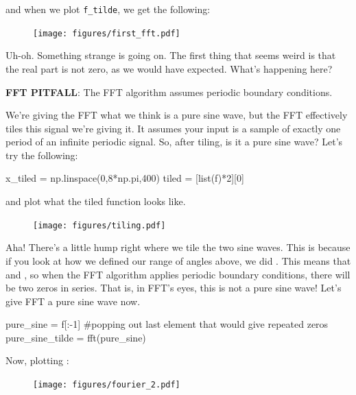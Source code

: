 \documentclass[a4paper]{article}
\newenvironment{colbox}[1]
  {\newcommand\colboxcolor{#1}%
   \begin{lrbox}{\selvestebox}%
   \begin{minipage}{\dimexpr\columnwidth-2\fboxsep\relax}}
  {\end{minipage}\end{lrbox}%
   \begin{center}
   \colorbox[HTML]{\colboxcolor}{\usebox{\selvestebox}}
   \end{center}}
\begin{document}
and when we plot \lstinline{f_tilde}, we get the following:

\begin{figure}[H]
    \centering
    \texttt{[image: figures/first\_fft.pdf]}
\end{figure}

Uh-oh. Something strange is going on. The first thing that seems weird is that the real part is not zero, as we would have expected. What's happening here?

\begin{colbox}{F8E0E0}
    \textbf{FFT PITFALL}: The FFT algorithm assumes periodic boundary conditions.
\end{colbox}

We're giving the FFT what we think is a pure sine wave, but the FFT effectively tiles this signal we're giving it. It assumes your input is a sample of exactly one period of an infinite periodic signal. So, after tiling, is it a pure sine wave? Let's try the following:
\begin{pyin}
x_tiled = np.linspace(0,8*np.pi,400)
tiled = [list(f)*2][0]
\end{pyin} 

\vspace{2pt}

and plot what the tiled function looks like. 

\begin{figure}[H]
    \centering
    \texttt{[image: figures/tiling.pdf]}
\end{figure}

Aha! There's a little hump right where we tile the two sine waves. This is because if you look at how we defined our range of angles above, we did . This means that  and , so when the FFT algorithm applies periodic boundary conditions, there will be two zeros in series. That is, in FFT's eyes, this is not a pure sine wave! Let's give FFT a pure sine wave now.

\begin{pyin}
pure_sine = f[:-1] #popping out last element that would give repeated zeros
pure_sine_tilde = fft(pure_sine)
\end{pyin}

Now, plotting :

\begin{figure}[H]
    \centering
    \texttt{[image: figures/fourier\_2.pdf]}
\end{figure}
\end{document}
